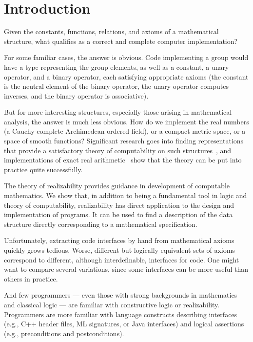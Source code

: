 \section{Introduction}
\label{sec:introduction}

Given the constants, functions, relations, and axioms of a mathematical
structure, what qualifies as a correct and complete computer implementation?

For some familiar cases, the answer is obvious. Code implementing a group would
have a type representing the group elements, as well as a constant, a unary
operator, and a binary operator, each satisfying appropriate axioms (the
constant is the neutral element of the binary operator, the unary operator computes inverses, and
the binary operator is associative).

But for more interesting structures, especially those arising in
mathematical analysis, the answer is much less obvious. How do we
implement the real numbers (a Cauchy-complete Archimedean ordered
field), or a compact metric space, or a space of smooth functions?
Significant research goes into finding representations that provide a
satisfactory theory of computability on such
structures~\cite{Wei00,TZ98,Bla97,EL00}, and implementations of exact
real arithmetic~\cite{Mue00,Lam05a} show that the theory can be put
into practice quite successfully.

The theory of realizability provides guidance in development of
computable mathematics.   We show that, in addition to being a
fundamental tool in logic and theory of computability, realizability
has direct application to the design and implementation of programs.
It can be used to find a description of the data structure directly
corresponding to a mathematical specification.

Unfortunately, extracting code interfaces by hand from mathematical axioms
quickly grows tedious. Worse, different but logically equivalent sets of axioms
correspond to different, although interdefinable, interfaces for code. One
might want to compare several variations, since some interfaces can be more
useful than others in practice.

And few programmers --- even those with strong backgrounds in
mathematics and classical logic --- are familiar with constructive logic or
realizability. Programmers are more familiar with language constructs
describing interfaces (e.g., C++ header files, ML signatures, or Java
interfaces) and logical assertions (e.g., preconditions
and postconditions).

